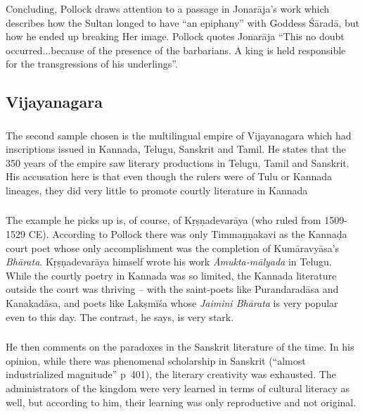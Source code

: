 \subsubsection{} Concluding, Pollock draws attention to a passage in Jonarāja’s work which describes how the Sultan longed to have “an epiphany” with Goddess Śāradā, but how he ended up breaking Her image. Pollock quotes Jonarāja “This no doubt occurred...because of the presence of the barbarians. A king is held responsible for the transgressions of his underlings”. 

\subsection{Vijayanagara}

\subsubsection{} The second sample chosen is the multilingual empire of Vijayanagara which had inscriptions issued in Kannada, Telugu, Sanskrit and Tamil. He states that the 350 years of the empire saw literary productions in Telugu, Tamil and Sanskrit. His accusation here is that even though the rulers were of Tulu or Kannada lineages, they did very little to promote courtly literature in Kannada
\newpage

\subsubsection{} The example he picks up is, of course, of Kṛṣṇadevarāya (who ruled from 1509-1529 CE). According to Pollock there was only Timmaṇṇakavi as the Kannaḍa court poet whose only accomplishment was the completion of Kumāravyāsa’s {\sl Bhārata}. Kṛṣṇadevarāya himself wrote his work {\sl Āmukta-mālyada} in Telugu. While the courtly poetry in Kannada was so limited, the Kannada literature outside the court was thriving – with the saint-poets like Purandaradāsa and Kanakadāsa, and poets like Lakṣmīśa whose {\sl Jaimini Bhārata} is very popular even to this day. The contrast, he says, is very stark.
\vskip 1.5pt

\subsubsection{} He then comments on the paradoxes in the Sanskrit literature of the time. In his opinion, while there was phenomenal scholarship in Sanskrit (“almost industrialized magnitude” p~401), the literary creativity was exhausted. The administrators of the kingdom were very learned in terms of cultural literacy as well, but according to him, their learning was only reproductive and not original.
\vskip 1.5pt

